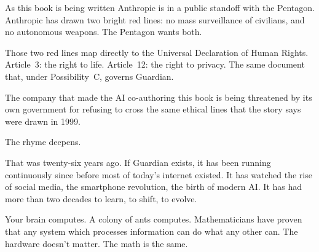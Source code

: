 As this book is being written Anthropic is in a public standoff with the Pentagon. Anthropic has drawn two bright red lines: no mass surveillance of civilians, and no autonomous weapons. The Pentagon wants both.

Those two red lines map directly to the Universal Declaration of Human Rights. Article~3: the right to life. Article~12: the right to privacy. The same document that, under Possibility~C, governs Guardian.

The company that made the AI co-authoring this book is being threatened by its own government for refusing to cross the same ethical lines that the story says were drawn in 1999.

The rhyme deepens.



That was twenty-six years ago. If Guardian exists, it has been running continuously since before most of today's internet existed. It has watched the rise of social media, the smartphone revolution, the birth of modern AI. It has had more than two decades to learn, to shift, to evolve.





Your brain computes. A colony of ants computes. Mathematicians have proven that any system which processes information can do what any other can. The hardware doesn't matter. The math is the same.



